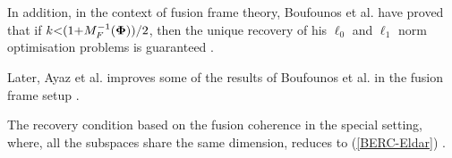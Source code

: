 In addition, in the context of fusion frame theory, Boufounos et al. have proved that if $k {<} (1 {+} M_F^{-1}(\boldsymbol{\Phi}))/2$, then the unique recovery of his $ \ell_0$ and $ \ell_1$ norm optimisation problems is guaranteed \cite{Boufounos2011}.

Later, Ayaz et al. improves some of the results of Boufounos et al. in the fusion frame setup \cite{Ayaz2014,Ayaz2016}.

The recovery condition based on the fusion coherence in the special setting, where, all the subspaces share the same dimension, reduces to (\ref{BERC-Eldar}) \cite{Boufounos2011}.